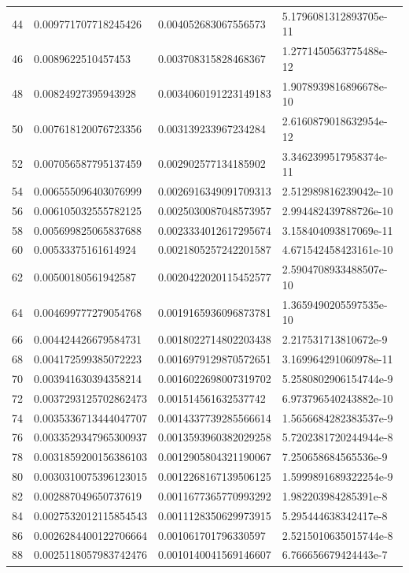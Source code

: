 \documentclass[11pt]{article}
\newenvironment{problem}[2][Question]{\begin{trivlist}
\item[\hskip \labelsep {\bfseries #1}\hskip \labelsep {\bfseries #2.}]}{\end{trivlist}}
\theoremstyle{definition}
\begin{document}
\begin{problem}{Q2}
\begin{enumerate}[(a)]
\begin{tabular}{| c | l | l | l | }
44 & 0.009771707718245426 & 0.004052683067556573 & 5.1796081312893705e-11 \\ 
46 & 0.0089622510457453 & 0.003708315828468367 & 1.2771450563775488e-12 \\ 
48 & 0.00824927395943928 & 0.0034060191223149183 & 1.9078939816896678e-10 \\ 
50 & 0.007618120076723356 & 0.003139233967234284 & 2.6160879018632954e-12 \\ 
52 & 0.007056587795137459 & 0.002902577134185902 & 3.3462399517958374e-11 \\ 
54 & 0.006555096403076999 & 0.0026916349091709313 & 2.512989816239042e-10 \\ 
56 & 0.006105032555782125 & 0.0025030087048573957 & 2.994482439788726e-10 \\ 
58 & 0.005699825065837688 & 0.0023334012617295674 & 3.158404093817069e-11 \\ 
60 & 0.00533375161614924 & 0.0021805257242201587 & 4.671542458423161e-10 \\ 
62 & 0.00500180561942587 & 0.0020422020115452577 & 2.5904708933488507e-10 \\ 
64 & 0.004699777279054768 & 0.0019165936096873781 & 1.3659490205597535e-10 \\ 
66 & 0.004424426679584731 & 0.0018022714802203438 & 2.217531713810672e-9 \\ 
68 & 0.004172599385072223 & 0.0016979129870572651 & 3.169964291060978e-11 \\ 
70 & 0.003941630394358214 & 0.0016022698007319702 & 5.2580802906154744e-9 \\ 
72 & 0.0037293125702862473 & 0.001514561632537742 & 6.973796540243882e-10 \\ 
74 & 0.0035336713444047707 & 0.0014337739285566614 & 1.5656684282383537e-9 \\ 
76 & 0.0033529347965300937 & 0.0013593960382029258 & 5.7202381720244944e-8 \\ 
78 & 0.0031859200156386103 & 0.0012905804321190067 & 7.250658684565536e-9 \\ 
80 & 0.0030310075396123015 & 0.0012268167139506125 & 1.5999891689322254e-9 \\ 
82 & 0.002887049650737619 & 0.0011677365770993292 & 1.982203984285391e-8 \\ 
84 & 0.0027532012115854543 & 0.0011128350629973915 & 5.295444638342417e-8 \\ 
86 & 0.0026284400122706664 & 0.001061701796330597 & 2.5215010635015744e-8 \\ 
88 & 0.0025118057983742476 & 0.0010140041569146607 & 6.766656679424443e-7 \\ 

\end{tabular}
\end{enumerate}
\end{problem}
\end{document}
